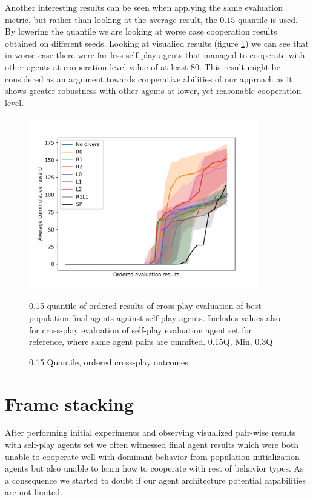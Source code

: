 Another interesting results can be seen when applying the same evaluation metric, but rather than looking at the average result, the $0.15$ quantile is used.
By lowering the quantile we are looking at worse case cooperation results obtained on different seeds.
Looking at visualied results (figure \ref{SimpleCNNOrderedAvg0.15Q}) we can see that in worse case there were far less self-play agents that managed to cooperate with other agents at cooperation level value of at least 80.
This result might be considered as an argument towards cooperative abilities of our approach as it shows greater robustness with other agents at lower, yet reasonable cooperation level.



\begin{figure}[!ht]
    \centering
    \includegraphics*[width=10cm]{../img/SimpleCNNOrderedAvg0.15Q.png}

    \caption{0.15 Quantile, ordered cross-play outcomes}
    \label{SimpleCNNOrderedAvg0.15Q}
    \medskip
    \small 
    0.15 quantile of ordered results of cross-play evaluation of best population final agents against self-play agents.
    Includes values also for cross-play evaluation of self-play evaluation agent set for reference, where same agent pairs are ommited.
    0.15Q, Min, 0.3Q

\end{figure}

\newpage


\section{Frame stacking}
After performing initial experiments and observing visualized pair-wise results with self-play agents set we often witnessed final agent results which were both unable to cooperate well with dominant behavior from population initialization agents but also unable to learn how to cooperate with rest of behavior types.
As a consequence we started to doubt if our agent architecture potential capabilities are not limited.


